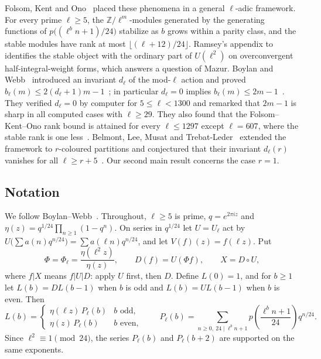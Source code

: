 \documentclass[11pt]{amsart}
\newcommand{\Z}{\mathbb{Z}}
\theoremstyle{plain}
\theoremstyle{definition}
\numberwithin{equation}{section}
\begin{document}
Folsom, Kent and Ono~\cite{FKO2012} placed these phenomena in a general $\ell$-adic framework. For every prime
$\ell\ge 5$, the $\Z/\ell^m$-modules generated by the generating functions of
$p\big((\ell^b n+1)/24\big)$ stabilize as $b$ grows within a parity class, and the stable modules have rank at most
$\lfloor(\ell+12)/24\rfloor$. Ramsey's appendix to~\cite{FKO2012} identifies the stable object with the ordinary part of
$U(\ell^2)$ on overconvergent half-integral-weight forms, which answers a question of Mazur. Boylan and
Webb~\cite{BoylanWebb2013} introduced an invariant $d_\ell$ of the mod-$\ell$ action and proved
$b_\ell(m)\le 2(d_\ell+1)m-1$~\cite[Thm.~5.1]{BoylanWebb2013}; in particular $d_\ell=0$ implies $b_\ell(m)\le 2m-1$~\cite[Thm.~1.2]{BoylanWebb2013}. They
verified $d_\ell=0$ by computer for $5\le\ell<1300$ and remarked that $2m-1$ is sharp in all computed cases with
$\ell\ge 29$. They also found that the Folsom--Kent--Ono rank bound is attained for every $\ell\le1297$ except
$\ell=607$, where the stable rank is one less~\cite[\S6]{BoylanWebb2013}. Belmont, Lee, Musat and Trebat-Leder~\cite{BLMT2014}
extended the framework to $r$-coloured partitions and conjectured that their invariant $d_\ell(r)$ vanishes for all
$\ell\ge r+5$~\cite[\S5]{BLMT2014}. Our second main result concerns the case $r=1$.

\subsection{Notation}\label{sec:notation}
We follow Boylan--Webb~\cite{BoylanWebb2013}. Throughout, $\ell\ge 5$ is prime, $q=e^{2\pi i z}$ and
$\eta(z)=q^{1/24}\prod_{n\ge1}(1-q^n)$. On series in $q^{1/24}$ let $U=U_\ell$ act by
$U\big(\sum a(n)q^{n/24}\big)=\sum a(\ell n)q^{n/24}$, and let $V(f)(z)=f(\ell z)$. Put
\[
  \Phi=\Phi_\ell=\frac{\eta(\ell^2z)}{\eta(z)},\qquad D(f)=U(\Phi f),\qquad X=D\circ U,
\]
where $f|X$ means $f|U|D$: apply $U$ first, then $D$. Define $L(0)=1$, and for $b\ge1$ let $L(b)=D L(b-1)$ when $b$ is odd and
$L(b)=U L(b-1)$ when $b$ is even. Then
\[
  L(b)=\begin{cases}\eta(\ell z)\,P_\ell(b)& b\text{ odd},\\ \eta(z)\,P_\ell(b) & b \text{ even},\end{cases}\qquad
  P_\ell(b)=\sum_{n\ge 0,\ 24\mid \ell^bn+1} p\!\left(\frac{\ell^b n+1}{24}\right)q^{n/24}.
\]
Since $\ell^2\equiv1\pmod{24}$, the series $P_\ell(b)$ and $P_\ell(b+2)$ are supported on the same exponents.
\end{document}
